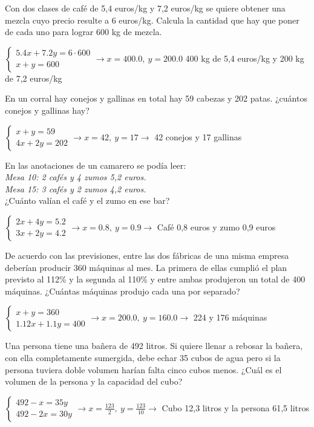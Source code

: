 \documentclass[spanish, 12pt]{exam}
\begin{document}
\begin{questions}
\question Con dos clases de café de 5,4 euros/kg y 7,2 euros/kg se quiere obtener una mezcla cuyo precio resulte a 6 euros/kg. Calcula la cantidad que hay que poner de cada uno para lograr 600 kg de mezcla.

\begin{solution} \to$\left\{\begin{matrix}5.4x+7.2y=6 \cdot 600 \\ x+y=600\end{matrix}\right. \to  x = 400.0, \  y = 200.0 $ 400 kg de 5,4 euros/kg y 200 kg de 7,2 euros/kg \end{solution}

\question En un corral hay conejos y gallinas en total hay 59 cabezas y 202 patas. ¿cuántos conejos y gallinas hay?
\begin{solution} $\left\{\begin{matrix}x+y=59 \\ 4x+2y=202\end{matrix}\right. \to  x = 42, \  y = 17 \to$ 42 conejos y 17 gallinas \end{solution}

\question En las anotaciones de un camarero se podía leer: \\
	\emph{Mesa 10: 2 cafés y 4 zumos 5,2 euros.\\
	Mesa 15: 3 cafés y 2 zumos 4,2 euros.}\\
¿Cuánto valían el café y el zumo en ese bar?
\begin{solution} $\left\{\begin{matrix}2x+4y=5.2 \\ 3x+2y=4.2\end{matrix}\right. \to  x = 0.8, \  y = 0.9 \to $ Café 0,8 euros y zumo 0,9 euros \end{solution}

\question De acuerdo con las previsiones, entre las dos fábricas de una misma empresa deberían producir 360 máquinas al mes. La primera de ellas cumplió el plan previsto al 112\% y la segunda al 110\% y entre ambas produjeron un total de 400 máquinas. ¿Cuántas máquinas produjo cada una por separado?
\begin{solution} $\left\{\begin{matrix}x+y=360 \\ 1.12x+1.1y=400\end{matrix}\right. \to  x = 200.0, \  y = 160.0 \to $
 224 y 176 máquinas \end{solution}

\question Una persona tiene una bañera de 492 litros. Si quiere llenar a rebosar la bañera, con ella completamente sumergida, debe echar 35 cubos de agua pero si la persona tuviera doble volumen harían falta cinco cubos menos. ¿Cuál es el volumen de la persona y la capacidad del cubo?
\begin{solution} $\left\{\begin{matrix}492-x=35y \\ 492-2x=30y\end{matrix}\right. \to  x = \frac{123}{2}, \  y = \frac{123}{10} \to $ Cubo 12,3 litros y la persona 61,5 litros \end{solution}


\end{questions}
\end{document}
